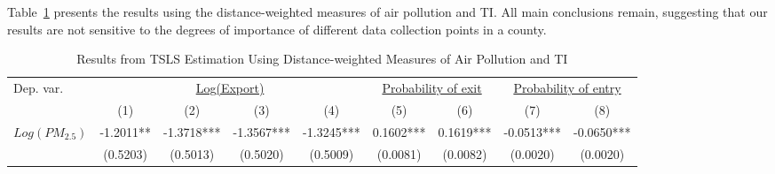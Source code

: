 \documentclass[12pt]{article}
\begin{document}
      Table~\ref{tab:robust_weighted_measure} presents the results using the distance-weighted measures of air pollution and TI. All main conclusions remain, suggesting that our results are not sensitive to the degrees of importance of different data collection points in a county. 
      \begin{table}[H]\centering
        \caption{Results from TSLS Estimation Using Distance-weighted Measures of Air Pollution and TI}\label{tab:robust_weighted_measure}
        \resizebox{\textwidth}{!}
        {
        \begin{tabular}{l*{8}{c}}
          \hline\hline
          Dep. var.              &\multicolumn{4}{c}{\underline{Log(Export)}}&\multicolumn{2}{c}{\underline{Probability of exit}}&\multicolumn{2}{c}{\underline{Probability of entry}}\\
                              &\multicolumn{1}{c}{(1)}&\multicolumn{1}{c}{(2)}&\multicolumn{1}{c}{(3)}&\multicolumn{1}{c}{(4)}&\multicolumn{1}{c}{(5)}&\multicolumn{1}{c}{(6)}&\multicolumn{1}{c}{(7)}&\multicolumn{1}{c}{(8)}\\

          \hline
          $Log(PM_{2.5})$      & -1.2011**  & -1.3718***& -1.3567*** &-1.3245*** &0.1602***&0.1619***&-0.0513*** &-0.0650***\\
                               &  (0.5203)  & (0.5013) & (0.5020)  &  (0.5009)    &(0.0081) &(0.0082)&(0.0020)& (0.0020)      \\
    

\end{tabular}}
\end{table}
\end{document}
